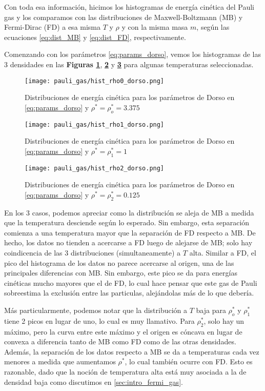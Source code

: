 Con toda esa información, hicimos los histogramas de energía cinética del Pauli gas y los comparamos con las distribuciones de Maxwell-Boltzmann (MB) y Fermi-Dirac (FD)
a esa misma $T$ y $\rho$ y con la misma masa $m$, según las ecuaciones \eqref{eq:dist_MB} y \eqref{eq:dist_FD}, respectivamente.

Comenzando con los parámetros \eqref{eq:params_dorso}, vemos los histogramas de las 3 densidades en las \textbf{Figuras \ref{fig:hist_rho0_dorso}}, 
\textbf{\ref{fig:hist_rho1_dorso}} y \textbf{\ref{fig:hist_rho2_dorso}} para algunas temperaturas seleccionadas.

\begin{figure}[H]
	\centering
	\texttt{[image: pauli\_gas/hist\_rho0\_dorso.png]}
	\caption{Distribuciones de energía cinética para los parámetros de Dorso en \eqref{eq:params_dorso} y $\rho^* = \rho_o^* = 3.375$}
	\label{fig:hist_rho0_dorso}
\end{figure}

\begin{figure}[H]
	\centering
	\texttt{[image: pauli\_gas/hist\_rho1\_dorso.png]}
	\caption{Distribuciones de energía cinética para los parámetros de Dorso en \eqref{eq:params_dorso} y $\rho^* = \rho_1^* = 1$}
	\label{fig:hist_rho1_dorso}
\end{figure}
\begin{figure}[H]
	\centering
	\texttt{[image: pauli\_gas/hist\_rho2\_dorso.png]}
	\caption{Distribuciones de energía cinética para los parámetros de Dorso en \eqref{eq:params_dorso} y $\rho^* = \rho_2^* = 0.125$}
	\label{fig:hist_rho2_dorso}
\end{figure}

En los 3 casos, podemos apreciar como la distribución se aleja de MB a medida que la temperatura desciende según lo esperado.
Sin embargo, esta separación comienza a una temperatura mayor que la separación de FD respecto a MB.
De hecho, los datos no tienden a acercarse a FD luego de alejarse de MB; solo hay coindicencia de las 3 distribuciones (simultaneamente) a $T$ alta.
Similar a FD, el pico del histograma de los datos no parece acercarse al origen, una de las principales diferencias con MB.
Sin embargo, este pico se da para energías cinéticas mucho mayores que el de FD, lo cual hace pensar que este gas de Pauli sobreestima la exclusión entre las particulas, alejándolas
más de lo que debería.

Más particularmente, podemos notar que la distribución a $T$ baja para $\rho_o^*$ y $\rho_1^*$ tiene 2 picos en lugar de uno, lo cual es muy llamativo.
Para $\rho_2^*$, solo hay un máximo, pero la curva entre este máximo y el origen es cóncava en lugar de convexa a diferencia tanto de MB como FD como de las otras densidades.
Además, la separación de los datos respecto a MB se da a temperaturas cada vez menores a medida que aumentamos $\rho^*$, lo cual también ocurre con FD.
Esto es razonable, dado que la noción de temperatura alta está muy asociada a la de densidad baja como discutimos en \ref{sec:intro_fermi_gas}.

